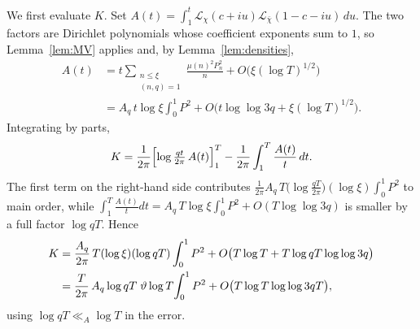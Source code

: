 \documentclass[10pt,a4paper]{amsart}
\numberwithin{equation}{section}
\begin{document}
We first evaluate $K$. Set $A(t)=\int_1^t\mathcal{L}_\chi(c+iu)\mathcal{L}_{\bar\chi}(1-c-iu)\,du$. The two factors are Dirichlet polynomials whose coefficient exponents sum to $1$, so Lemma~\ref{lem:MV} applies and, by Lemma~\ref{lem:densities},
\[
\begin{aligned}
A(t)&=t\sum_{\substack{n\le\xi\\(n,q)=1}}\frac{\mu(n)^2P_n^2}{n}+O\bigl(\xi(\log T)^{1/2}\bigr)\\
&=A_q\,t\log\xi\int_0^1 P^2+O\bigl(t\log\log 3q+\xi(\log T)^{1/2}\bigr).
\end{aligned}
\]
Integrating by parts,
\[
K=\frac{1}{2\pi}\Bigl[\log\tfrac{qt}{2\pi}\,A(t)\Bigr]_1^T-\frac{1}{2\pi}\int_1^T\frac{A(t)}{t}\,dt.
\]
The first term on the right-hand side contributes $\frac{1}{2\pi}A_q\,T\bigl(\log\tfrac{qT}{2\pi}\bigr)(\log\xi)\int_0^1 P^2$ to main order, while $\int_1^T\frac{A(t)}{t}dt=A_q\,T\log\xi\int_0^1 P^2+O(T\log\log 3q)$ is smaller by a full factor $\log qT$. Hence
\begin{align}
K&=\frac{A_q}{2\pi}\,T(\log\xi)(\log qT)\int_0^1 P^2+O\bigl(T\log T+T\log qT\log\log 3q\bigr)\notag\\
&=\frac{T}{2\pi}\,A_q\log qT\;\vartheta\log T\!\int_0^1 P^2+O\bigl(T\log T\log\log 3qT\bigr),\label{eq:K-MN}
\end{align}
using $\log qT\ll_A\log T$ in the error.
\end{document}
